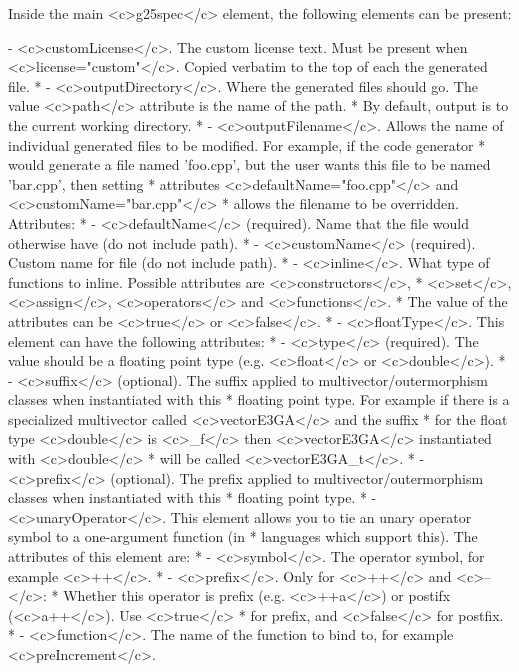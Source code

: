 \documentclass[10pt, a4paper]{article}
\begin{document}
  
Inside the main <c>g25spec</c> element, the following elements can be present:
\begin{itemize}
    - <c>customLicense</c>. The custom license text. Must be present when <c>license="custom"</c>. Copied verbatim to the top of each the generated file.
 *   - <c>outputDirectory</c>. Where the generated files should go. The value <c>path</c> attribute is the name of the path.
 *      By default, output is to the current working directory.
 *   - <c>outputFilename</c>. Allows the name of individual generated files to be modified. For example, if the code generator 
 *      would generate a file named 'foo.cpp', but the user wants this file to be named 'bar.cpp', then setting 
 *      attributes <c>defaultName="foo.cpp"</c> and <c>customName="bar.cpp"</c>
 *      allows the filename to be overridden. Attributes:
 *        - <c>defaultName</c> (required). Name that the file would otherwise have (do not include path).
 *        - <c>customName</c> (required). Custom name for file (do not include path).
 *   - <c>inline</c>. What type of functions to inline. Possible attributes are <c>constructors</c>, 
 *     <c>set</c>, <c>assign</c>, <c>operators</c> and <c>functions</c>.
 *     The value of the attributes can be <c>true</c> or <c>false</c>.
 *   - <c>floatType</c>. This element can have the following attributes:
 *        - <c>type</c> (required). The value should be a floating point type (e.g. <c>float</c> or <c>double</c>).
 *        - <c>suffix</c> (optional). The suffix applied to multivector/outermorphism classes when instantiated with this
 *           floating point type. For example if there is a specialized multivector called <c>vectorE3GA</c> and the suffix
 *           for the float type <c>double</c> is <c>_f</c> then <c>vectorE3GA</c> instantiated with <c>double</c>
 *           will be called <c>vectorE3GA_t</c>.
 *        - <c>prefix</c> (optional). The prefix applied to multivector/outermorphism classes when instantiated with this
 *           floating point type.
 *   - <c>unaryOperator</c>. This element allows you to tie an unary operator symbol to a one-argument function (in
 *     languages which support this). The attributes of this element are:
 *        - <c>symbol</c>. The operator symbol, for example <c>++</c>.
 *        - <c>prefix</c>. Only for <c>++</c> and <c>--</c>:
 *           Whether this operator is prefix (e.g. <c>++a</c>) or postifx (<c>a++</c>). Use <c>true</c>
 *           for prefix, and <c>false</c> for postfix. 
 *        - <c>function</c>. The name of the function to bind to, for example <c>preIncrement</c>.

\end{itemize}
\end{document}
